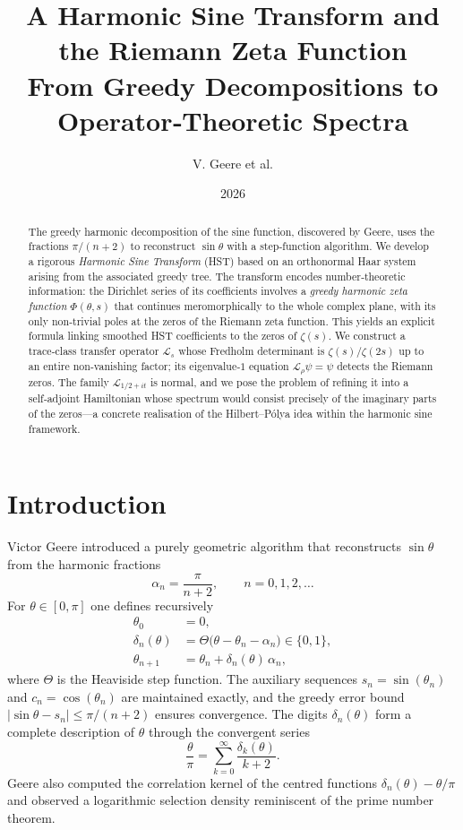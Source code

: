\documentclass[11pt,a4paper]{article}
\title{\bfseries A Harmonic Sine Transform and the Riemann Zeta Function\\
\large From Greedy Decompositions to Operator‑Theoretic Spectra}
\author{V. Geere et al.}
\date{2026}
\theoremstyle{remark}
\begin{document}
\maketitle

\begin{abstract}
The greedy harmonic decomposition of the sine function, discovered by Geere, uses the fractions \(\pi/(n+2)\) to reconstruct \(\sin\theta\) with a step‑function algorithm. We develop a rigorous \emph{Harmonic Sine Transform} (HST) based on an orthonormal Haar system arising from the associated greedy tree. The transform encodes number‑theoretic information: the Dirichlet series of its coefficients involves a \emph{greedy harmonic zeta function} \(\Phi(\theta,s)\) that continues meromorphically to the whole complex plane, with its only non‑trivial poles at the zeros of the Riemann zeta function. This yields an explicit formula linking smoothed HST coefficients to the zeros of \(\zeta(s)\). We construct a trace‑class transfer operator \(\mathcal{L}_s\) whose Fredholm determinant is \(\zeta(s)/\zeta(2s)\) up to an entire non‑vanishing factor; its eigenvalue‑\(1\) equation \(\mathcal{L}_\rho\psi=\psi\) detects the Riemann zeros. The family \(\mathcal{L}_{1/2+it}\) is normal, and we pose the problem of refining it into a self‑adjoint Hamiltonian whose spectrum would consist precisely of the imaginary parts of the zeros—a concrete realisation of the Hilbert–Pólya idea within the harmonic sine framework.
\end{abstract}

\tableofcontents

\section{Introduction}
Victor Geere \cite{Geere2026a,Geere2026b} introduced a purely geometric algorithm that reconstructs \(\sin\theta\) from the harmonic fractions
\[
\alpha_n=\frac{\pi}{n+2},\qquad n=0,1,2,\dots
\]
For \(\theta\in[0,\pi]\) one defines recursively
\begin{equation}\label{eq:greedy}
\begin{aligned}
\theta_0&=0,\\
\delta_n(\theta)&=\Theta\bigl(\theta-\theta_n-\alpha_n\bigr)\in\{0,1\},\\
\theta_{n+1}&=\theta_n+\delta_n(\theta)\,\alpha_n,
\end{aligned}
\end{equation}
where \(\Theta\) is the Heaviside step function. The auxiliary sequences \(s_n=\sin(\theta_n)\) and \(c_n=\cos(\theta_n)\) are maintained exactly, and the greedy error bound \(|\sin\theta-s_n|\le\pi/(n+2)\) ensures convergence. The digits \(\delta_n(\theta)\) form a complete description of \(\theta\) through the convergent series
\begin{equation}\label{eq:expansion}
\frac{\theta}{\pi}=\sum_{k=0}^{\infty}\frac{\delta_k(\theta)}{k+2}.
\end{equation}
Geere also computed the correlation kernel of the centred functions \(\delta_n(\theta)-\theta/\pi\) and observed a logarithmic selection density reminiscent of the prime number theorem.
\end{document}
